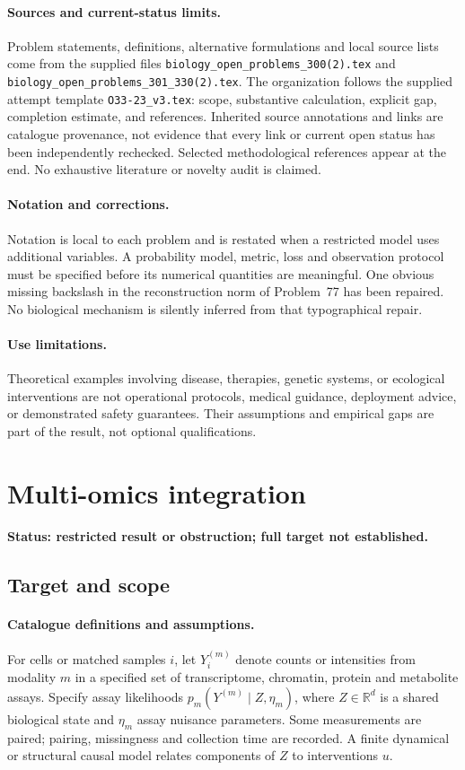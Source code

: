 \documentclass[11pt]{article}
\begin{document}
\paragraph{Sources and current-status limits.}
Problem statements, definitions, alternative formulations and local source lists
come from the supplied files
\texttt{biology\_open\_problems\_300(2).tex} and
\texttt{biology\_open\_problems\_301\_330(2).tex}.
The organization follows the supplied attempt template
\texttt{O33-23\_v3.tex}: scope, substantive calculation, explicit gap,
completion estimate, and references. Inherited source annotations and links are
catalogue provenance, not evidence that every link or current open status has
been independently rechecked. Selected methodological references appear at the
end. No exhaustive literature or novelty audit is claimed.

\paragraph{Notation and corrections.}
Notation is local to each problem and is restated when a restricted model uses
additional variables. A probability model, metric, loss and observation protocol
must be specified before its numerical quantities are meaningful. One obvious
missing backslash in the reconstruction norm of Problem~77 has been repaired.
No biological mechanism is silently inferred from that typographical repair.

\paragraph{Use limitations.}
Theoretical examples involving disease, therapies, genetic systems, or ecological
interventions are not operational protocols, medical guidance, deployment advice,
or demonstrated safety guarantees. Their assumptions and empirical gaps are part
of the result, not optional qualifications.


\section*{Multi-omics integration}
\label{prob:058}
\noindent\textbf{Status: restricted result or obstruction; full target not established.}
\subsection{Target and scope}
\paragraph{Catalogue definitions and assumptions.}
For cells or matched samples $i$, let $Y_i^{(m)}$ denote counts or intensities from modality $m$ in a specified set of transcriptome, chromatin, protein and metabolite assays. Specify assay likelihoods $p_m(Y^{(m)}\mid Z,\eta_m)$, where $Z\in\mathbb{R}^d$ is a shared biological state and $\eta_m$ assay nuisance parameters. Some measurements are paired; pairing, missingness and collection time are recorded. A finite dynamical or structural causal model relates components of $Z$ to interventions $u$.
\end{document}
